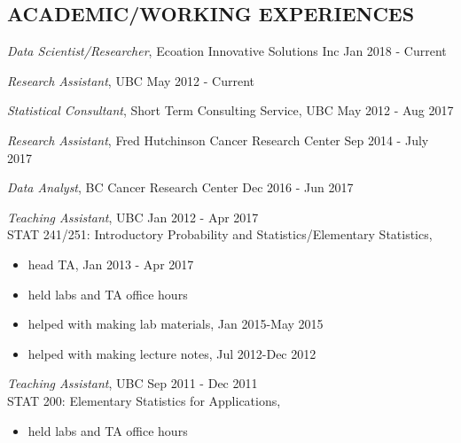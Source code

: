 \documentclass[margin]{res}
\begin{document}
\begin{resume}
 
\section{ACADEMIC/WORKING EXPERIENCES} 

\vspace{30pt}

{\sl Data Scientist/Researcher}, Ecoation Innovative Solutions Inc \hfill Jan 2018 - Current 

{\sl Research Assistant}, UBC \hfill May 2012 - Current 

{\sl Statistical Consultant}, Short Term Consulting Service, UBC
\hfill May 2012 - Aug 2017

{\sl Research Assistant}, Fred Hutchinson Cancer Research Center 
                 \hfill Sep 2014 - July 2017 


{\sl Data Analyst}, BC Cancer Research Center
                 \hfill Dec 2016 - Jun 2017 
                

{\sl Teaching Assistant}, UBC \hfill Jan 2012 - Apr 2017 \\
                STAT 241/251: Introductory Probability and Statistics/Elementary Statistics, \\
                 \begin{itemize}  \itemsep -2pt %
                 \item head TA, Jan 2013 - Apr 2017
                 \item held labs and TA office hours
                 \item helped with making lab materials, Jan 2015-May 2015
                 \item helped with making lecture notes, Jul 2012-Dec 2012                 
                \end{itemize}
 
 {\sl Teaching Assistant}, UBC \hfill Sep 2011 - Dec 2011 \\
                STAT 200: Elementary Statistics for Applications, 
                \begin{itemize} \itemsep -2pt %
                    \item held labs and TA office hours
                \end{itemize}


\end{resume}
\end{document}
